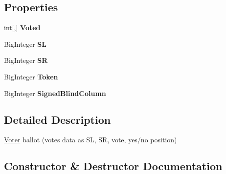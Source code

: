\subsection*{Properties}
\begin{DoxyCompactItemize}
\item 
\hypertarget{class_voter_1_1_voter_ballot_a8c7c5487fc638872fd9f9cbe9fd12bc3}{}int\mbox{[},\mbox{]} {\bfseries Voted}\label{class_voter_1_1_voter_ballot_a8c7c5487fc638872fd9f9cbe9fd12bc3}

\item 
\hypertarget{class_voter_1_1_voter_ballot_aa591a90931ed53d539117425897b6528}{}Big\+Integer {\bfseries S\+L}\label{class_voter_1_1_voter_ballot_aa591a90931ed53d539117425897b6528}

\item 
\hypertarget{class_voter_1_1_voter_ballot_a1b4aec46e919986eae6202c860f9c6e5}{}Big\+Integer {\bfseries S\+R}\label{class_voter_1_1_voter_ballot_a1b4aec46e919986eae6202c860f9c6e5}

\item 
\hypertarget{class_voter_1_1_voter_ballot_a537baffdb84d11dbd93aa356f3382b27}{}Big\+Integer {\bfseries Token}\label{class_voter_1_1_voter_ballot_a537baffdb84d11dbd93aa356f3382b27}

\item 
\hypertarget{class_voter_1_1_voter_ballot_a32511f4dcc46ee028f82d0bdb28eb6ba}{}Big\+Integer {\bfseries Signed\+Blind\+Column}\label{class_voter_1_1_voter_ballot_a32511f4dcc46ee028f82d0bdb28eb6ba}

\end{DoxyCompactItemize}


\subsection{Detailed Description}
\hyperlink{class_voter_1_1_voter}{Voter} ballot (vote\textquotesingle{}s data as S\+L, S\+R, vote, yes/no position) 



\subsection{Constructor \& Destructor Documentation}
\hypertarget{class_voter_1_1_voter_ballot_a78ca278f7add21b16e29b4f91569812e}{}
